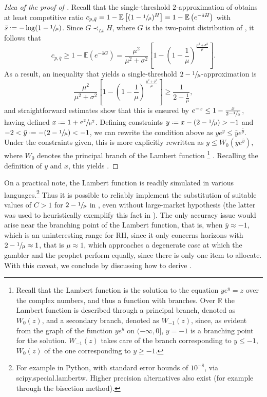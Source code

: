 \documentclass[11pt, a4paper, twoside]{article}
\newcommand*{\defeq}{\mathrel{\vcenter{\baselineskip0.5ex \lineskiplimit0pt
			\hbox{\scriptsize.}\hbox{\scriptsize.}}}=}
\newcommand{\RR}{\mathbb{R}}
\newcommand{\EE}{\mathbb{E}}
\numberwithin{equation}{section}
\begin{document}
	\begin{proof}[Idea of the proof of ]
		Recall that the single-threshold $2$-approximation of  obtains at least competitive ratio $c_{p,\bar{q}}=1-\EE\left[(1-\sfrac{1}{\mu})^H\right]=1-\EE \left( e^{-\bar{s}H}\right)$ with $\bar{s}\defeq-\log(1-\sfrac{1}{\mu})$. Since $G\prec_{Lt}H$, where $G$ is the two-point distribution of , 
it follows that
		\begin{equation}\label{deterministic}
			c_{p,\bar{q}}\ge1-\EE\left( e^{-\bar{s}G}\right)=\frac{\mu^2}{\mu^2+\sigma^2}\left[1-\left(1-\frac{1}{\mu}\right)^\frac{\mu^2+\sigma^2}{\mu}\right].
		\end{equation}
		As a result, an inequality that yields a single-threshold $2-\sfrac{1}{\mu}$-approximation is
		\begin{equation}\label{replaceC}
			\frac{\mu^2}{\mu^2+\sigma^2}\left[1-\left(1-\frac{1}{\mu}\right)^\frac{\mu^2+\sigma^2}{\mu}\right]\ge\frac{1}{2-\frac{1}{\mu}},
		\end{equation}
		and straightforward estimates show that this is ensured by $e^{-x}\le1-\frac{x}{2-\sfrac{1}{\mu}}$, having defined $x\defeq 1+\sfrac{\sigma^2}{\mu^2}$. Defining constraints $y\defeq x-(2-\sfrac{1}{\mu})>-1$ and $-2<\bar{y}\defeq-(2-\sfrac{1}{\mu})<-1$, we can rewrite the condition above as $ye^y\le\bar{y}e^{\bar{y}}$. Under the constraints given, this is more explicitly rewritten as $y\le W_0(\bar{y}e^{\bar{y}})$, where $W_0$ denotes the principal branch of the Lambert function \footnote{Recall that the Lambert function is the solution to the equation $ye^y=z$ over the complex numbers, and thus a function with branches. Over $\RR$ the Lambert function is described through a principal branch, denoted as $W_0(z)$, and a secondary branch, denoted as $W_{-1}(z)$, since, as evident from the graph of the function $ye^y$ on $(-\infty,0]$, $y=-1$ is a branching point for the solution. $W_{-1}(z)$ takes care of the branch corresponding to $y\le-1$, $W_{0}(z)$ of the one corresponding to $y\ge-1$.} . Recalling the definition of $y$ and $x$, this yields .
	\end{proof}
	On a practical note, the Lambert function is readily simulated in various languages.\footnote{For example in Python, with standard error bounds of $10^{-8}$, via scipy.special.lambertw. Higher precision alternatives also exist (for example through the bisection method).} Thus it is possible to reliably implement the substitution of suitable values of $C>1$ for $2-\sfrac{1}{\mu}$ in , even without large-market hypothesis (the latter was used to heuristically exemplify this fact in ). The only accuracy issue would arise near the branching point of the Lambert function, that is, when $\bar{y}\approx-1$, which is an uninteresting range for RH, since it only concerns horizons with $2-\sfrac{1}{\mu}\approx 1$, that is $\mu\approx 1$, which approaches a degenerate case at which the gambler and the prophet perform equally, since there is only one item to allocate. With this caveat, we conclude by discussing how to derive . 
	
\end{document}
